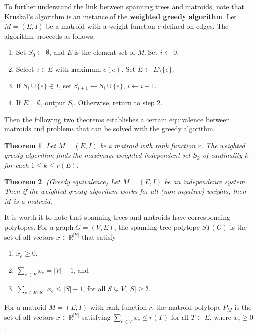 \documentclass[12pt]{article}
\newcommand{\R}{\mathbb{R}}
\theoremstyle{plain}
\newtheorem*{theorem*}{Theorem}
\begin{document}
To further understand the link between spanning trees and matroids, note that Kruskal's algorithm is an instance of the \textbf{weighted greedy algorithm}. Let $M=(E,I)$ be a matroid with a weight function $c$ defined on edges. The algorithm proceeds as follows:
\begin{enumerate}
    \item Set $S_0\gets\emptyset$, and $E$ is the element set of $M$. Set $i\gets 0$.
    \item Select $e\in E$ with maximum $c(e)$. Set $E\gets E\setminus\{e\}$.
    \item If $S_i\cup\{e\}\in I$, set $S_{i+1}\gets S_i\cup\{e\}$, $i\gets i + 1$.
    \item If $E = \emptyset$, output $S_i$. Otherwise, return to step 2.
\end{enumerate}
Then the following two theorems establishes a certain equivalence between matroids and problems that can be solved with the greedy algorithm.
\begin{theorem*}
    Let $M=(E,I)$ be a matroid with rank function $r$. The weighted greedy algorithm finds the maximum weighted independent set $S_k$ of cardinality $k$ for each $1\leq k\leq r(E)$.
\end{theorem*}
\begin{theorem*}{\textup{(Greedy equivalence)}}
    Let $M=(E,I)$ be an independence system. Then if the weighted greedy algorithm works for all (non-negative) weights, then $M$ is a matroid.
\end{theorem*}
\indent It is worth it to note that spanning trees and matroids have corresponding polytopes. For a graph $G=(V,E)$, the spanning tree polytope $ST(G)$ is the set of all vectors $x\in \R^{|E|}$ that satisfy
\begin{enumerate}
    \item $x_e \geq 0$,
    \item $\displaystyle\sum_{e\in E} x_e = |V| - 1$, and
    \item $\displaystyle\sum_{e\in E[S]} x_e \leq |S| - 1$, for all $S\subsetneq V, |S| \geq 2$.
\end{enumerate}
For a matroid $M=(E,I)$ with rank function $r$, the matroid polytope $P_M$ is the set of all vectors $x\in \R^{|E|}$ satisfying $\displaystyle\sum_{e\in T} x_e \leq r(T)$ for all $T\subset E$, where $x_e\geq 0$.
\end{document}
